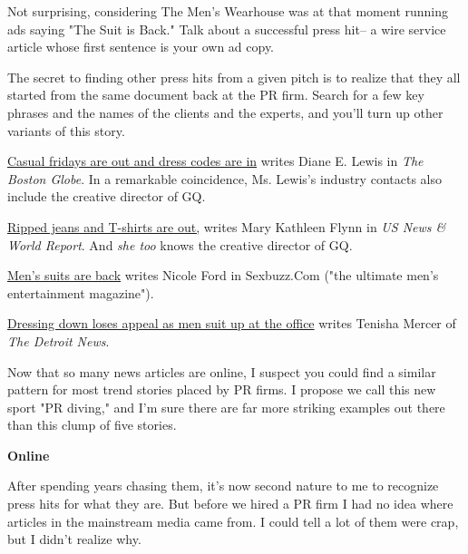 Not
                  surprising, considering The Men's Wearhouse was at that moment
                  running ads saying "The Suit is Back." Talk about a successful
                  press hit-- a wire service article whose first sentence is
                  your own ad copy.

The secret to finding other press
                  hits from a given pitch is to realize that they all started
                  from the same document back at the PR firm. Search for a few
                  key phrases and the names of the clients and the experts, and
                  you'll turn up other variants of this story.

\href{http://bostonworks.boston.com/globe/articles/091904\_suit.html}{Casual fridays are out and dress codes are in}
                  writes Diane E. Lewis in \emph{The Boston Globe}. In a
                  remarkable coincidence, Ms. Lewis's industry contacts also
                  include the creative director of GQ.

\href{http://www.usnews.com/usnews/biztech/articles/041108/8eedress.htm}{Ripped jeans and T-shirts are out,}
                  writes Mary Kathleen Flynn in \emph{US News \& World Report}.
                  And \emph{she too} knows the creative director of GQ.

\href{http://www.sexbuzz.com/style/9,0004,00.shtml}{Men's suits are back}
                  writes Nicole Ford in Sexbuzz.Com ("the ultimate men's
                  entertainment magazine").

\href{http://www.detnews.com/2004/careers/0405/28/b01-149207.htm}{Dressing down loses appeal as men suit up at the office}
                  writes Tenisha Mercer of \emph{The Detroit News}.


                  Now that so many news articles are online, I suspect you could
                  find a similar pattern for most trend stories placed by PR
                  firms. I propose we call this new sport "PR diving," and I'm
                  sure there are far more striking examples out there than this
                  clump of five stories.

\textbf{Online}

After spending years chasing them, it's now
                  second nature to me to recognize press hits for what they are.
                  But before we hired a PR firm I had no idea where articles in
                  the mainstream media came from. I could tell a lot of them
                  were crap, but I didn't realize why.

